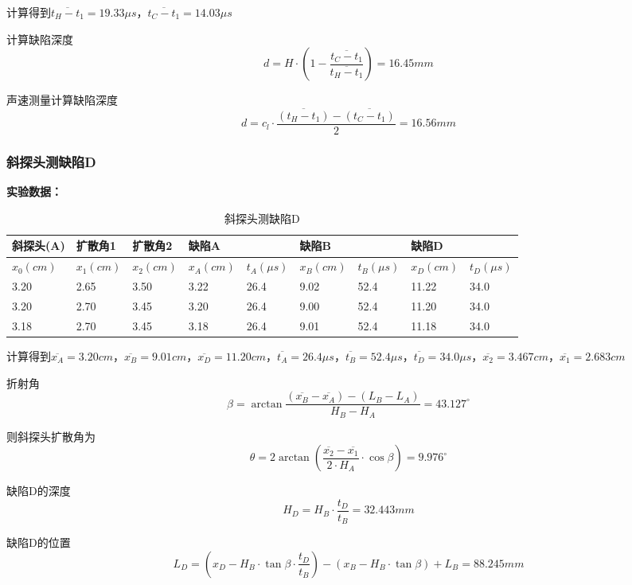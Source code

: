 \documentclass[UTF8]{ctexart}
\newcommand\df[2]{\dfrac{#1}{#2}}
\begin{document}
计算得到\(\overline{t_H-t_1}=19.33\mu s\)，\(\overline{t_C-t_1}=14.03\mu s\)

计算缺陷深度\[d=H \cdot (1-\df{\overline{t_C-t_1}}{\overline{t_H-t_1}})=16.45mm\]


声速测量计算缺陷深度\[d=c_l \cdot \df{\overline{(t_H-t_1)}-\overline{(t_C-t_1)}}{2}=16.56mm\]

\subsubsection{斜探头测缺陷D}

\textbf{实验数据：}

\begin{table}[!ht]
    \centering
    \caption{斜探头测缺陷D}
    \begin{tabular}{|l|l|l|l|l|l|l|l|l|}
    \hline
        \textbf{斜探头(A)} & \textbf{扩散角1} & \textbf{扩散角2} & \textbf{缺陷A} &  & \textbf{缺陷B} &  & \textbf{缺陷D} &  \\ \hline
        \(x_0(cm)\) & \(x_1(cm)\) & \(x_2(cm)\) & \(x_A(cm)\) & \(t_A(\mu s)\) & \(x_B(cm)\) & \(t_B(\mu s)\) & \(x_D(cm)\) & \(t_D(\mu s)\) \\ \hline
        3.20 & 2.65 & 3.50 & 3.22 & 26.4 & 9.02 & 52.4 & 11.22 & 34.0 \\ \hline
        3.20 & 2.70 & 3.45 & 3.20 & 26.4 & 9.00 & 52.4 & 11.20 & 34.0 \\ \hline
        3.18 & 2.70 & 3.45 & 3.18 & 26.4 & 9.01 & 52.4 & 11.18 & 34.0 \\ \hline
    \end{tabular}
    \label{table3}
\end{table}

计算得到\(\overline{x_A}=3.20cm\)，\(\overline{x_B}=9.01cm\)，\(\overline{x_D}=11.20cm\)，\(\overline{t_A}=26.4\mu s\)，\(\overline{t_B}=52.4\mu s\)，\(\overline{t_D}=34.0\mu s\)，\(\overline{x_2}=3.467cm\)，\(\overline{x_1}=2.683cm\)

折射角\[\beta=\arctan\df{(\overline{x_B}-\overline{x_A})-(L_B-L_A)}{H_B-H_A}=43.127^{\circ}\]

则斜探头扩散角为\[\theta=2\arctan(\df{\overline{x_2}-\overline{x_1}}{2\cdot H_A}\cdot\cos\beta)=9.976^{\circ}\]

缺陷D的深度\[H_D=H_B\cdot\df{t_D}{t_B}=32.443mm\]

缺陷D的位置\[L_D=(x_D-H_B\cdot\tan\beta\cdot\df{t_D}{t_B})-(x_B-H_B\cdot\tan\beta)+L_B=88.245mm\]


\end{document}
